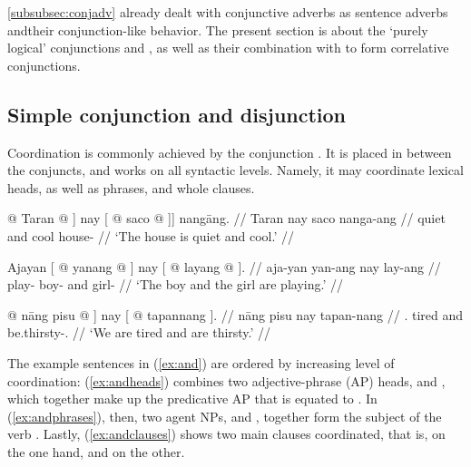 \autoref{subsubsec:conjadv} already dealt with conjunctive adverbs as sentence
adverbs andtheir conjunction-like behavior. The present section is about the
`purely logical' conjunctions  and
, as well as their combination with 
 to form correlative conjunctions.

\subsection{Simple conjunction and disjunction}


Coordination is commonly achieved by the conjunction . It is
placed in between the conjuncts, and works on all syntactic levels. Namely, it
may coordinate lexical heads, as well as phrases, and whole clauses.

\pex\label{ex:and}
\a\label{ex:andheads}\begingl
	\gla {\normalfont [\tsup{AP}[\tsup{A}} @ Taran @ {\normalfont ]} nay  
		{\normalfont [} @ saco @ {\normalfont ]]} nangāng. //
	\glb {} Taran {} nay {} saco {} nanga-ang //
	\glc {} quiet {} and {} cool {} house-\Aarg{} //
	\glft `The house is quiet and cool.' //
\endgl

\a\label{ex:andphrases}\begingl
	\gla Ajayan {\normalfont [} @ yanang @ {\normalfont ]} nay 
{\normalfont [} @ layang @ {\normalfont ].} //
	\glb aja-yan {} yan-ang {} nay {} lay-ang {} //
	\glc play-\TplM{} {} boy-\Aarg{} {} and {} girl-\Aarg{} {} //
	\glft `The boy and the girl are playing.' //
\endgl

\a\label{ex:andclauses}\begingl
	\gla {\normalfont [\tsup{S}} @ nāng pisu @ {\normalfont ]} nay 
{\normalfont [} @ tapannang {\normalfont ].} //
	\glb {} nāng pisu {} nay {} tapan-nang {} //
	\glc {} \Fpl{}.\Aarg{} tired {} and {} be.thirsty-\Fpl{}.\Aarg{} {} //
	\glft `We are tired and are thirsty.' //
\endgl

\xe

The example sentences in (\ref{ex:and}) are ordered by increasing level of
coordination: (\ref{ex:andheads}) combines two adjective-phrase (AP) heads,
 and , which together make up
the predicative AP that is equated to . In
(\ref{ex:andphrases}), then, two agent NPs,  and
, together form the subject of the verb
. Lastly, (\ref{ex:andclauses}) shows two main
clauses coordinated, that is,  on the
one hand, and  on the other.

